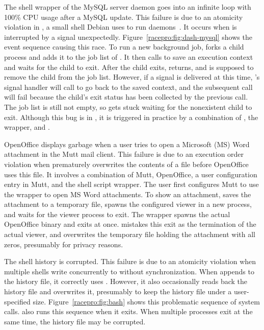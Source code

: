  The shell wrapper
 of the MySQL server daemon  goes into an
infinite loop with 100\% CPU usage after a MySQL update.
This failure is due to an atomicity violation in ,
a small shell Debian uses to run daemons~\cite{dash}.  It occurs
when  is interrupted by a signal unexpectedly.
Figure~\ref{racepro:fig:dash-mysql} shows the event sequence causing this race.
To run a new background job,  forks a child process and
adds it to the job list of .  It then calls  to save an execution
context and waits for the child to exit.  After the child exits,
 returns, and  is supposed to remove the child from
the job list.  However, if a signal is delivered at this time, 's
signal handler will call  to go back to the saved 
context, and the subsequent  call will fail because the child's
exit status has been collected by the previous  call.  
The job list is still not empty, so  gets stuck waiting for the
nonexistent child to exit.  Although this bug is in , it is
triggered in practice by a combination of , the 
wrapper, and .

  OpenOffice displays
garbage when a user tries to open a Microsoft (MS) Word attachment in the
Mutt mail client.
This failure is due to an execution order violation
when  prematurely overwrites the contents of a file
before OpenOffice uses this file.  It involves a
combination of Mutt, OpenOffice, a user configuration entry
in Mutt, and the  shell script wrapper.  The user
first configures Mutt to use the  wrapper to open
MS Word attachments.  To show an attachment,  saves the
attachment to a temporary file, spawns the configured viewer in a new
process, and waits for the viewer process to exit.  The 
wrapper spawns the actual OpenOffice binary and exits at once.
 mistakes this exit as the termination of the actual viewer, and
overwrites the temporary file holding the attachment with all zeros,
presumably for privacy reasons.

 The  shell history is corrupted.
This failure is due to an atomicity violation
when multiple  shells write concurrently
to  without synchronization.
When  appends to the history file, it correctly uses
.  However, it also occasionally reads back the history
file and overwrites it, presumably to keep the history file under a
user-specified size.  Figure~\ref{racepro:fig:bash} shows this problematic
sequence of system calls.   also runs this sequence when it
exits.  When multiple  processes exit at the same time, the
history file may be corrupted. 

